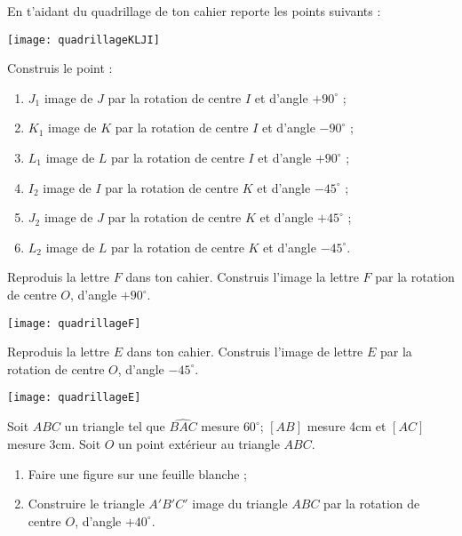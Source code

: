 \vspace{-2.5cm}
\begin{exercice}
En t'aidant du quadrillage de ton cahier reporte les points suivants :
\begin{center} \texttt{[image: quadrillageKLJI]} \end{center}
Construis le point :
\begin{enumerate}
 \item $J_1$ image de $J$ par la rotation de centre $I$ et d’angle $+ 90^\circ$ ;
 \item $K_1$ image de $K$ par la rotation de centre $I$ et d’angle $- 90^\circ$ ;
 \item $L_1$ image de $L$ par la rotation de centre $I$ et d’angle $+ 90^\circ$ ;
 \item $I_2$ image de $I$ par la rotation de centre $K$ et d’angle $- 45^\circ$ ;
 \item $J_2$ image de $J$ par la rotation de centre $K$ et d’angle $+ 45^\circ$ ;
 \item $L_2$ image de $L$ par la rotation de centre $K$ et d’angle $- 45^\circ$.
 \end{enumerate}
\end{exercice}


\begin{exercice}
Reproduis la lettre $F$ dans ton cahier. Construis l'image la lettre $F$ par la rotation de centre $O$, d'angle $+ 90^\circ$.
\begin{center} \texttt{[image: quadrillageF]} \end{center}
\end{exercice}


\begin{exercice}
Reproduis la lettre $E$ dans ton cahier. Construis l'image de lettre $E$ par la rotation de centre $O$, d'angle $- 45^\circ$.
\begin{center} \texttt{[image: quadrillageE]} \end{center}
\end{exercice}


\begin{exercice}
Soit $ABC$ un triangle tel que $\widehat{BAC}$ mesure $60^\circ$; $[AB]$ mesure 4cm et $[AC]$ mesure 3cm. Soit $O$ un point extérieur au triangle $ABC$.
\begin{enumerate}
 \item Faire une figure sur une feuille blanche ;
 \item Construire le triangle $A'B'C'$ image du triangle $ABC$ par la rotation de centre $O$, d'angle $+ 40^\circ$.
 \end{enumerate}
\end{exercice}


